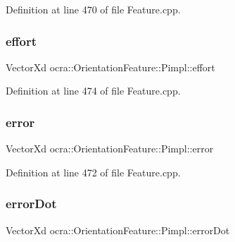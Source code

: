 Definition at line 470 of file Feature.\+cpp.

\hypertarget{structocra_1_1OrientationFeature_1_1Pimpl_a4e6285f990db663f2c73f629ae854650}{}\label{structocra_1_1OrientationFeature_1_1Pimpl_a4e6285f990db663f2c73f629ae854650} 
\subsubsection{\texorpdfstring{effort}{effort}}
{\footnotesize\ttfamily Vector\+Xd ocra\+::\+Orientation\+Feature\+::\+Pimpl\+::effort}



Definition at line 474 of file Feature.\+cpp.

\hypertarget{structocra_1_1OrientationFeature_1_1Pimpl_ac388b9a7c770d1c5af07c5b8f011a430}{}\label{structocra_1_1OrientationFeature_1_1Pimpl_ac388b9a7c770d1c5af07c5b8f011a430} 
\subsubsection{\texorpdfstring{error}{error}}
{\footnotesize\ttfamily Vector\+Xd ocra\+::\+Orientation\+Feature\+::\+Pimpl\+::error}



Definition at line 472 of file Feature.\+cpp.

\hypertarget{structocra_1_1OrientationFeature_1_1Pimpl_ad7b019fb36061c7906b7d68cd107a542}{}\label{structocra_1_1OrientationFeature_1_1Pimpl_ad7b019fb36061c7906b7d68cd107a542} 
\subsubsection{\texorpdfstring{error\+Dot}{errorDot}}
{\footnotesize\ttfamily Vector\+Xd ocra\+::\+Orientation\+Feature\+::\+Pimpl\+::error\+Dot}



